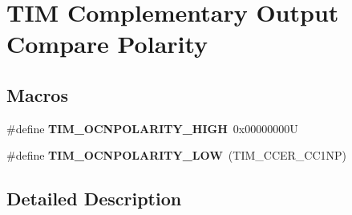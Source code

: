 \hypertarget{group___t_i_m___output___compare___n___polarity}{}\section{T\+IM Complementary Output Compare Polarity}
\label{group___t_i_m___output___compare___n___polarity}
\subsection*{Macros}
\begin{DoxyCompactItemize}
\item 
\mbox{\label{group___t_i_m___output___compare___n___polarity_gad5dbeb61519e4fd55db3a4d136e96316}} 
\#define {\bfseries T\+I\+M\+\_\+\+O\+C\+N\+P\+O\+L\+A\+R\+I\+T\+Y\+\_\+\+H\+I\+GH}~0x00000000U
\item 
\mbox{\label{group___t_i_m___output___compare___n___polarity_gadb44419c891a58e2cde11cc016f71a14}} 
\#define {\bfseries T\+I\+M\+\_\+\+O\+C\+N\+P\+O\+L\+A\+R\+I\+T\+Y\+\_\+\+L\+OW}~(T\+I\+M\+\_\+\+C\+C\+E\+R\+\_\+\+C\+C1\+NP)
\end{DoxyCompactItemize}


\subsection{Detailed Description}
